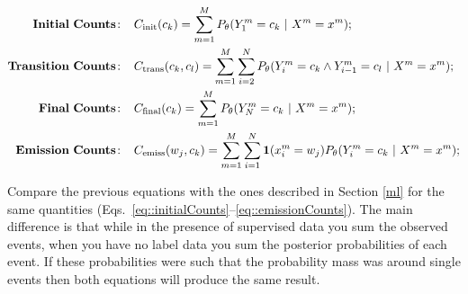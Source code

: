 \begin{align}
\mathbf{Initial \ Counts\!:}\;\;\;\;  &  C_{\mathrm{init}}(c_k) = \sum_{m=1}^M
P_{\theta} (Y^m_1 = c_k \,\,|\,\, X^m = x^m); \label{eq::initialCountsPost}\\
%
%
\mathbf{Transition \ Counts\!:}\;\;\;\;  &  C_{\mathrm{trans}}(c_k,c_l) =
\sum_{m=1}^M  \sum_{i = 2}^{N}
P_{\theta}(Y^m_i = c_k \wedge Y^m_{i-1} = c_l \,\,|\,\, X^m = x^m); \label{eq::transitionCountsPost}\\
%
\mathbf{Final \ Counts\!:}\;\;\;\;  &  C_{\mathrm{final}}(c_k) = \sum_{m=1}^M
P_{\theta} (Y^m_N = c_k \,\,|\,\, X^m = x^m); \label{eq::finalCountsPost}\\
%
\mathbf{Emission \ Counts\!:}\;\;\;\;  &  
C_{\mathrm{emiss}}(w_j,c_k) = \sum_{m=1}^M
\sum_{i = 1}^{N}
\Ind (x^m_i = w_j) P_{\theta}(Y^m_i = c_k \,\,|\,\, X^m = x^m); \label{eq::emissionCountsPost}
\end{align}


Compare the previous equations with the ones described in Section
\ref{ml} for the same quantities (Eqs.~\ref{eq::initialCounts}--\ref{eq::emissionCounts}). The main difference is that while in
the presence of supervised data you sum the observed events, when you
have no label data you sum the posterior probabilities of each
event. If these probabilities were such that the probability mass was
around single events then both equations will produce the same result.



